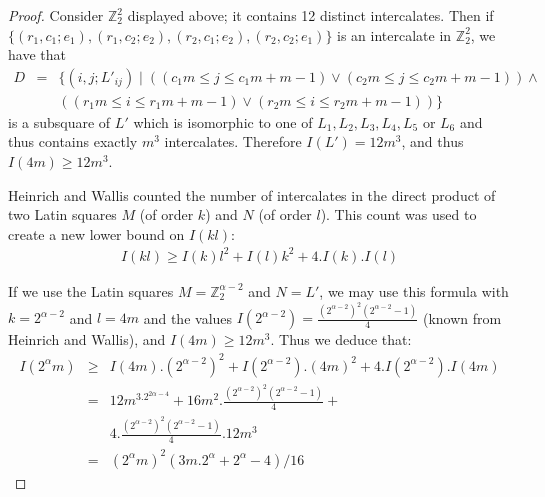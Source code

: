 \documentclass[10pt,a4paper]{amsart}
\begin{document}
\begin{proof}
{
Consider ${\mathbb Z}_2^2$ displayed above; it contains 12 distinct intercalates.
Then if $\{(r_1,c_1;e_1),(r_1,c_2;e_2),(r_2,c_1;e_2),(r_2,c_2;e_1)\}$
is an intercalate in ${\mathbb Z}_2^2$, we have that
\begin{eqnarray*}
D &=& \{ (i,j;L'_{ij}) \mid ((c_1m \leq j \leq c_1m+m-1) \vee (c_2m \leq j \leq c_2m+m-1)) \wedge \\
&& ((r_1m \leq i \leq r_1m+m-1) \vee (r_2m \leq i \leq r_2m+m-1)) \}
\end{eqnarray*}
is a subsquare of $L'$ which is isomorphic to one of $L_1, L_2, L_3, L_4, L_5$
or $L_6$ and thus contains exactly $m^3$ intercalates.  Therefore $I(L') = 12m^3$, and thus $I(4m) \geq 12m^3$.

Heinrich and Wallis counted the number of intercalates in the direct
product of two Latin squares $M$ (of order $k$) and $N$ (of order $l$).
This count was used to create a new lower bound on $I(kl)$:
\begin{eqnarray*}
I(kl) \geq I(k) l^2 + I(l) k^2 + 4.I(k).I(l)
\end{eqnarray*}

If we use the Latin squares $M = {\mathbb Z}_2^{\alpha-2}$ and $N = L'$,
we may use this formula with $k = 2^{\alpha-2}$ and $l = 4m$
and the values $I(2^{\alpha-2}) = \displaystyle{\frac{(2^{\alpha-2})^2
(2^{\alpha-2}-1)}{4}}$ (known from Heinrich and Wallis), and $I(4m)
\geq 12m^3$.  Thus we deduce that:
\begin{eqnarray*}
I(2^\alpha m) &\geq& I(4m).(2^{\alpha-2})^2 + I(2^{\alpha-2}).(4m)^2 + 4.I(2^{\alpha-2}).I(4m) \\
&=& 12m^3.2^{2\alpha-4} + 16m^2.\displaystyle{\frac{(2^{\alpha-2})^2 (2^{\alpha-2}-1)}{4}} +  \\
&& 4.\displaystyle{\frac{(2^{\alpha-2})^2 (2^{\alpha-2}-1)}{4}}.12m^3 \\
&=& (2^\alpha m)^2 (3m.2^\alpha + 2^\alpha - 4)/16
\end{eqnarray*}
}
\end{proof}
\end{document}
